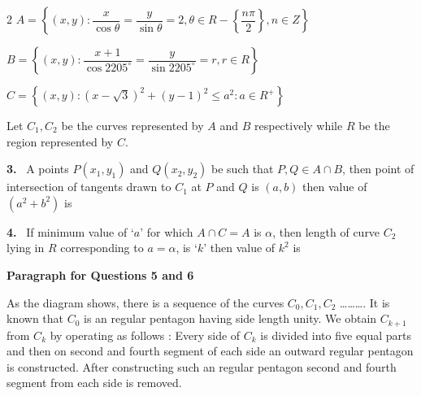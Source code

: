 \documentclass[10pt]{extarticle}
\newcommand{\qn}[1]{\par\smallskip\noindent\textbf{#1.}~}
\newcommand{\paraq}[2]{\par\smallskip\noindent\textbf{Paragraph for Questions #1 and #2}\par}
\begin{document}
\begin{multicols}{2}
$A=\left\{(x,y):\dfrac x{\cos\theta}=\dfrac y{\sin\theta}=2,\theta\in R-\left\{\dfrac{n\pi}2\right\},n\in Z\right\}$

$B=\left\{(x,y):\dfrac{x+1}{\cos2205^\circ}=\dfrac y{\sin2205^\circ}=r,r\in R\right\}$

$C=\left\{(x,y):\left(x-\sqrt3\right)^2+(y-1)^2\leqslant a^2:a\in R^+\right\}$

Let $C_1,C_2$ be the curves represented by $A$ and $B$ respectively while $R$ be the region represented by $C$.
\qn{3} A points $P(x_1,y_1)$ and $Q(x_2,y_2)$ be such that $P,Q\in A\cap B$, then point of intersection of tangents drawn to $C_1$ at $P$ and $Q$ is $(a,b)$ then value of $\left(a^2+b^2\right)$ is
\qn{4} If minimum value of `$a$' for which $A\cap C=A$ is $\alpha$, then length of curve $C_2$ lying in $R$ corresponding to $a=\alpha$, is `$k$' then value of $k^2$ is
\paraq{5}{6} As the diagram shows, there is a sequence of the curves $C_0,C_1,C_2$ \ldots\ldots\ldots. It is known that $C_0$ is an regular pentagon having side length unity. We obtain $C_{k+1}$ from $C_k$ by operating as follows : Every side of $C_k$ is divided into five equal parts and then on second and fourth segment of each side an outward regular pentagon is constructed. After constructing such an regular pentagon second and fourth segment from each side is removed.


\end{multicols}
\end{document}
